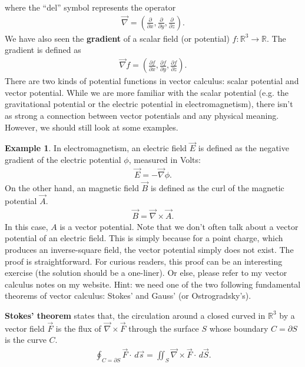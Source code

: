 \documentclass{book}
\theoremstyle{definition}
\newtheorem{exmp}{Example}[section]
\begin{document}
where the ``del'' symbol represents the operator
\begin{align*}
\vec{\nabla} = \left( \frac{\partial }{\partial x} , \frac{\partial }{\partial y} , \frac{\partial }{\partial z} \right). 
\end{align*}
We have also seen the \textbf{gradient} of a scalar field (or potential) $f : \mathbb{R}^3 \rightarrow \mathbb{R}$. The gradient is defined as
\begin{align*}
\vec{\nabla}f = \left( \frac{\partial f}{\partial x} , \frac{\partial f }{\partial y} , \frac{\partial f}{\partial z}\right) .
\end{align*}
There are two kinds of potential functions in vector calculus: scalar potential and vector potential. While we are more familiar with the scalar potential (e.g. the gravitational potential or the electric potential in electromagnetism), there isn't as strong a connection between vector potentials and any physical meaning. However, we should still look at some examples. 
\begin{exmp}
In electromagnetism, an electric field $\vec{E}$ is defined as the negative gradient of the electric potential $\phi$, measured in Volts:
\begin{align*}
\vec{E} = -\vec{\nabla}\phi.
\end{align*}
On the other hand, an magnetic field $\vec{B}$ is defined as the curl of the magnetic potential $\vec{A}$.
\begin{align*}
\vec{B} = \vec{\nabla}\times\vec{A}.
\end{align*}
In this case, $A$ is a vector potential. Note that we don't often talk about a vector potential of an electric field. This is simply because for a point charge, which produces an inverse-square field, the vector potential simply does not exist. The proof is straightforward. For curious readers, this proof can be an interesting exercise (the solution should be a one-liner). Or else, please refer to my vector calculus notes on my website. Hint: we need one of the two following fundamental theorems of vector calculus: Stokes' and Gauss' (or Ostrogradsky's).
\end{exmp}
\textbf{Stokes' theorem} states that, the circulation around a closed curved in $\mathbb{R}^3$ by a vector field $\vec{F}$ is the flux of $\vec{\nabla}\times\vec{F}$ through the surface $S$ whose boundary $C = \partial S$ is the curve $C$.
\begin{align*}\boxed{
\oint_{C = \partial S} \vec{F}\cdot\,d\vec{s} = \iint_{S} \vec{\nabla}\times \vec{F} \cdot\,d\vec{S}.}
\end{align*}
\end{document}
